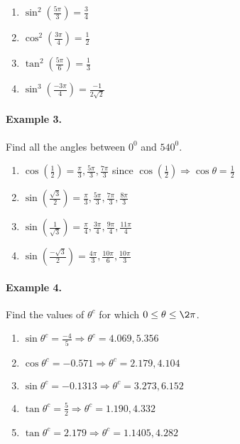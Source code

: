 \documentclass{article}
\begin{document}
\begin{enumerate}[label=\alph*)]
  \item $\sin^{2}\left( \frac{5\pi}{3} \right)=\frac{3}{4}$
  \item $\cos^{2}\left( \frac{3\pi}{4} \right)=\frac{1}{2}$
  \item $\tan^{2}\left( \frac{5\pi}{6} \right)=\frac{1}{3}$
  \item $\sin^{3}\left( \frac{-3\pi}{4} \right)=\frac{-1}{2\sqrt{2}}$
\end{enumerate}

\paragraph{Example 3.}
Find all the angles between $0^{0}$ and $540^{0}$.

\begin{enumerate}[label=\alph*)]
  \item $\cos\left(\frac{1}{2}\right) = \frac{\pi}{3}, \frac{5\pi}{3}, \frac{7\pi}{3}$ since $\cos\left(\frac{1}{2}\right) \Rightarrow \cos\theta=\frac{1}{2}$
  \item $\sin\left(\frac{\sqrt{3}}{2}\right) = \frac{\pi}{3}, \frac{5\pi}{3}, \frac{7\pi}{3}, \frac{8\pi}{3}$
  \item $\sin\left(\frac{1}{\sqrt{3}}\right) = \frac{\pi}{4}, \frac{3\pi}{4}, \frac{9\pi}{4}, \frac{11\pi}{4}$
  \item $\sin\left(\frac{-\sqrt{3}}{2}\right) = \frac{4\pi}{3}, \frac{10\pi}{6}, \frac{10\pi}{3}$
\end{enumerate}

\paragraph{Example 4.}
Find the values of $\theta^{c}$ for which $0\leq\theta\leq\2\pi$.

\begin{enumerate}[label=\alph*)]
  \item $\sin\theta^{c}=\frac{-4}{5} \Rightarrow \theta^{c}=4.069, 5.356$
  \item $\cos\theta^{c}=-0.571 \Rightarrow \theta^{c}=2.179, 4.104$
  \item $\sin\theta^{c}=-0.1313 \Rightarrow \theta^{c}=3.273, 6.152$
  \item $\tan\theta^{c}=\frac{5}{2} \Rightarrow \theta^{c}=1.190, 4.332$
  \item $\tan\theta^{c}=2.179 \Rightarrow \theta^{c}=1.1405, 4.282$
\end{enumerate}
\end{document}
